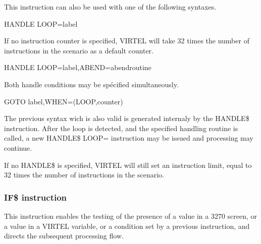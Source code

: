 \documentclass[letterpaper,10pt,english]{sphinxmanual}
\begin{document}
This instruction can also be used with one of the following syntaxes.

\begin{sphinxVerbatim}[commandchars=\\\{\}]
HANDLE\PYGZdl{} LOOP=label
\end{sphinxVerbatim}

If no instruction counter is specified, VIRTEL will take 32 times the number of instructions in the scenario as a default
counter.

\begin{sphinxVerbatim}[commandchars=\\\{\}]
HANDLE\PYGZdl{} LOOP=label,ABEND=abendroutine
\end{sphinxVerbatim}

Both handle conditions may be spécified simultaneously.

\begin{sphinxVerbatim}[commandchars=\\\{\}]
GOTO\PYGZdl{} label,WHEN=(LOOP,counter)
\end{sphinxVerbatim}

The previous syntax wich is also valid is generated internaly by the HANDLE\$ instruction.
After the loop is detected, and the specified handling routine is called, a new HANDLE\$ LOOP= instruction may be
issued and processing may continue.

If no HANDLE\$ is specified, VIRTEL will still set an instruction limit, equal to 32 times the number of instructions in the
scenario.


\subsubsection{IF\$ instruction}
\label{\detokenize{User_Guide:if-instruction}}\label{\detokenize{User_Guide:v457ug-if}}
This instruction enables the testing of the presence of a value in a 3270 screen, or a value in a VIRTEL variable, or a
condition set by a previous instruction, and directs the subsequent processing flow.
\end{document}

